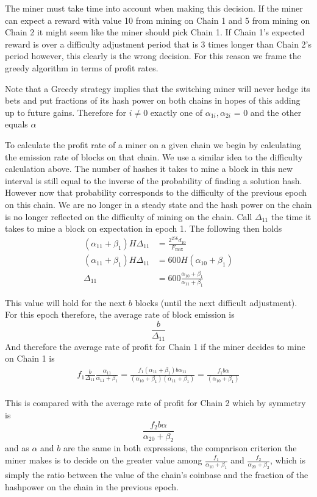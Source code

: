 \documentclass[12pt]{article}
\begin{document}
The miner must take time into account when making this decision.  If the miner can expect a reward with value 10 from mining on Chain 1 and 5 from mining on Chain 2 it might seem like the miner should pick Chain 1.  If Chain 1's expected reward is over a difficulty adjustment period that is 3 times longer than Chain 2's period however, this clearly is the wrong decision.  For this reason we frame the greedy algorithm in terms of profit rates.

Note that a Greedy strategy implies that the switching miner will never hedge its bets and put fractions of its hash power on both chains in hopes of this adding up to future gains.  Therefore for $i \neq 0$ exactly one of $\alpha_{1i}, \alpha_{2i}$ = 0 and the other equals $\alpha$

To calculate the profit rate of a miner on a given chain we begin by calculating the emission rate of blocks on that chain.  We use a similar idea to the difficulty calculation above.  The number of hashes it takes to mine a block in this new interval is still equal to the inverse of the probability of finding a solution hash.  However now that probability corresponds to the difficulty of the previous epoch on this chain.  We are no longer in a steady state and the hash power on the chain is no longer reflected on the difficulty of mining on the chain.  Call $\Delta_{11}$ the time it takes to mine a block on expectation in epoch 1.  The following then holds
\begin{align*}
(\alpha_{11} + \beta_1)H\Delta_{11} &= \frac{2^{256}d_{10}}{F_{\text{max}}}\\
(\alpha_{11} + \beta_1)H\Delta_{11} &= 600H(\alpha_{10} + \beta_1)\\
\Delta_{11} &= 600 \frac{\alpha_{10} + \beta_1}{ \alpha_{11} + \beta_1}
\end{align*}

This value will hold for the next $b$ blocks (until the next difficult adjustment).  For this epoch therefore, the average rate of block emission is 
$$
\frac{b}{\Delta_{11} }
$$
And therefore the average rate of profit for Chain 1 if the miner decides to mine on Chain 1 is
\begin{align*}
f_1 \frac{b}{\Delta_{11} } \frac{\alpha_{11}}{ \alpha_{11} + \beta_1} = \frac{f_1 ( \alpha_{11} + \beta_1) b \alpha_{11}}{(\alpha_{10} + \beta_1)(\alpha_{11} + \beta_1)} = \frac{f_1 b \alpha}{(\alpha_{10} + \beta_1)}\\
\end{align*}

This is compared with the average rate of profit for Chain 2 which by symmetry is 
$$
\frac{f_2b\alpha}{\alpha_{20} + \beta_2}
$$
and as $\alpha$ and $b$ are the same in both expressions, the comparison criterion the miner makes is to decide on the greater value among $\frac{f_1}{\alpha_{10} + \beta_1}$ and $\frac{f_2}{\alpha_{20} + \beta_2}$, which is simply the ratio between the value of the chain's coinbase and the fraction of the hashpower on the chain in the previous epoch.



\end{document}
